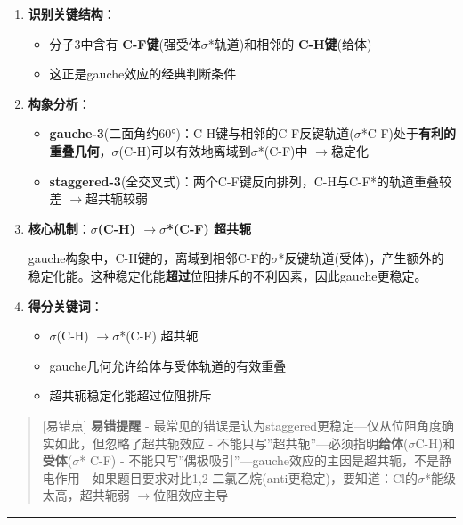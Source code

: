 \documentclass[a4paper,11pt]{ctexart}
\providecommand{\tightlist}{\setlength{\itemsep}{0pt}\setlength{\parskip}{0pt}}
\newcommand{\箭}{\ensuremath{\rightarrow}}
\newcommand{\左箭}{\ensuremath{\leftarrow}}
\newcommand{\上箭}{\ensuremath{\uparrow}}
\newcommand{\下箭}{\ensuremath{\downarrow}}
\newcommand{\衡}{\ensuremath{\rightleftharpoons}}
\newcommand{\双箭}{\ensuremath{\leftrightarrow}}
\newcommand{\约等于}{\ensuremath{\approx}}
\newcommand{\小于等于}{\ensuremath{\leq}}
\newcommand{\大于等于}{\ensuremath{\geq}}
\newcommand{\不等于}{\ensuremath{\neq}}
\newcommand{\西格马}{\ensuremath{\sigma}}
\newcommand{\派}{\ensuremath{\pi}}
\begin{document}
\begin{enumerate}
\def\labelenumi{\arabic{enumi}.}
\item
  \textbf{识别关键结构}：

  \begin{itemize}
  \tightlist
  \item
    分子3中含有 \textbf{C-F键}(强受体\西格马*轨道)和相邻的 \textbf{C-H键}(给体)
  \item
    这正是gauche效应的经典判断条件
  \end{itemize}
\item
  \textbf{构象分析}：

  \begin{itemize}
  \tightlist
  \item
    \textbf{gauche-3}(二面角约60°)：C-H键与相邻的C-F反键轨道(\西格马*C-F)处于\textbf{有利的重叠几何}，\西格马(C-H)可以有效地离域到\西格马*(C-F)中 \箭 稳定化
  \item
    \textbf{staggered-3}(全交叉式)：两个C-F键反向排列，C-H与C-F*的轨道重叠较差 \箭 超共轭较弱
  \end{itemize}
\item
  \textbf{核心机制}：\textbf{\西格马(C-H) \箭 \西格马*(C-F) 超共轭}

  gauche构象中，C-H键的，离域到相邻C-F的\西格马*反键轨道(受体)，产生额外的稳定化能。这种稳定化能\textbf{超过}位阻排斥的不利因素，因此gauche更稳定。
\item
  \textbf{得分关键词}：

  \begin{itemize}
  \tightlist
  \item
    \西格马(C-H) \箭 \西格马*(C-F) 超共轭
  \item
    gauche几何允许给体与受体轨道的有效重叠
  \item
    超共轭稳定化能超过位阻排斥
  \end{itemize}
\end{enumerate}

\begin{quote}
{[}易错点{]} \textbf{易错提醒}
- 最常见的错误是认为staggered更稳定---仅从位阻角度确实如此，但忽略了超共轭效应
- 不能只写''超共轭''---必须指明\textbf{给体}(\西格马 C-H)和\textbf{受体}(\西格马* C-F)
- 不能只写''偶极吸引''---gauche效应的主因是超共轭，不是静电作用
- 如果题目要求对比1,2-二氯乙烷(anti更稳定)，要知道：Cl的\西格马*能级太高，超共轭弱 \箭 位阻效应主导
\end{quote}

\begin{center}\rule{0.5\linewidth}{0.5pt}\end{center}
\end{document}
